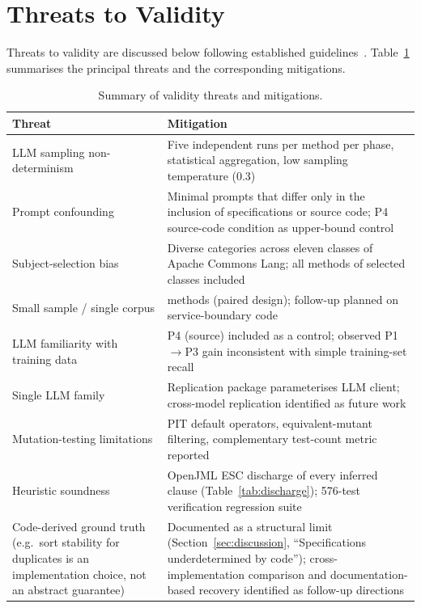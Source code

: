 \section{Threats to Validity}
\label{sec:threats}

Threats to validity are discussed below following established guidelines~\cite{wohlin2012experimentation}. Table~\ref{tab:threats-summary} summarises the principal threats and the corresponding mitigations.

\begin{table}[ht]
\centering
\caption{Summary of validity threats and mitigations.}
\label{tab:threats-summary}
\begin{tabular}{>{\raggedright\arraybackslash}p{3.5cm}>{\raggedright\arraybackslash}p{8.5cm}}
\toprule
\textbf{Threat} & \textbf{Mitigation} \\
\midrule
LLM sampling non-determinism & Five independent runs per method per phase, statistical aggregation, low sampling temperature (0.3) \\
Prompt confounding & Minimal prompts that differ only in the inclusion of specifications or source code; P4 source-code condition as upper-bound control \\
Subject-selection bias & Diverse categories across eleven classes of Apache Commons Lang; all methods of selected classes included \\
Small sample / single corpus & 312 methods (paired design); follow-up planned on service-boundary code \\
LLM familiarity with training data & P4 (source) included as a control; observed P1$\rightarrow$P3 gain inconsistent with simple training-set recall \\
Single LLM family & Replication package parameterises LLM client; cross-model replication identified as future work \\
Mutation-testing limitations & PIT default operators, equivalent-mutant filtering, complementary test-count metric reported \\
Heuristic soundness & OpenJML ESC discharge of every inferred clause (Table~\ref{tab:discharge}); 576-test verification regression suite \\
Code-derived ground truth (e.g.\ sort stability for duplicates is an implementation choice, not an abstract guarantee) & Documented as a structural limit (Section~\ref{sec:discussion}, ``Specifications underdetermined by code''); cross-implementation comparison and documentation-based recovery identified as follow-up directions \\
\bottomrule
\end{tabular}
\end{table}

